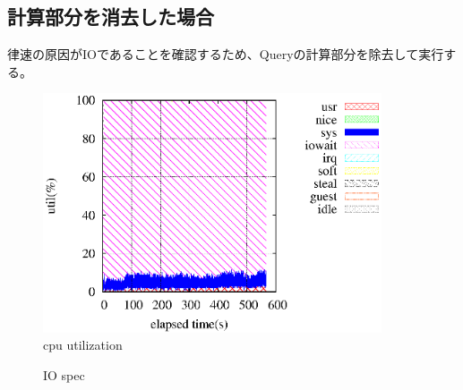 \documentclass[11pt,a4paper]{jsarticle}
\newlength{\subfigwidth}
\newlength{\subfigcolsep}
\begin{document}
\clearpage
\subsection{計算部分を消去した場合}
律速の原因がIOであることを確認するため、Queryの計算部分を除去して実行す
る。
\begin{figure}[thbp]
 \begin{center}
  \includegraphics[width=100mm]{1idxscanmin_ra0core1.eps}
 \end{center}
 \caption{cpu utilization}
 \label{fig:1idxmin0core1}
\end{figure}

\begin{figure}[thbp]
 \setlength{\subfigwidth}{.5\linewidth}
 \addtolength{\subfigwidth}{-.5\subfigcolsep}
 \begin{minipage}[b]{\subfigwidth}
 \end{minipage}
  \begin{minipage}[b]{\subfigwidth}
  \end{minipage}
  \caption{IO spec}
  \label{fig:1idxramin0}
\end{figure}
\end{document}
